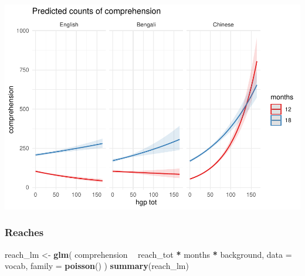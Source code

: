\documentclass[]{article}
\newenvironment{Shaded}{\begin{snugshade}}{\end{snugshade}}
\newcommand{\DataTypeTok}[1]{\textcolor[rgb]{0.13,0.29,0.53}{#1}}
\newcommand{\KeywordTok}[1]{\textcolor[rgb]{0.13,0.29,0.53}{\textbf{#1}}}
\newcommand{\NormalTok}[1]{#1}
\newcommand{\OperatorTok}[1]{\textcolor[rgb]{0.81,0.36,0.00}{\textbf{#1}}}
\newcommand{\StringTok}[1]{\textcolor[rgb]{0.31,0.60,0.02}{#1}}
\begin{document}
\includegraphics{supplement_files/figure-latex/hgp-lm-2-plot-1.pdf}

\hypertarget{reaches-1}{%
\subsubsection{Reaches}\label{reaches-1}}

\begin{Shaded}
\begin{Highlighting}[]
\NormalTok{reach_lm <-}\StringTok{ }\KeywordTok{glm}\NormalTok{(}
\NormalTok{  comprehension }\OperatorTok{~}
\StringTok{    }\NormalTok{reach_tot }\OperatorTok{*}
\StringTok{    }\NormalTok{months }\OperatorTok{*}
\StringTok{    }\NormalTok{background,}
  \DataTypeTok{data =}\NormalTok{ vocab,}
  \DataTypeTok{family =} \KeywordTok{poisson}\NormalTok{()}
\NormalTok{)}
\KeywordTok{summary}\NormalTok{(reach_lm)}
\end{Highlighting}
\end{Shaded}
\end{document}
